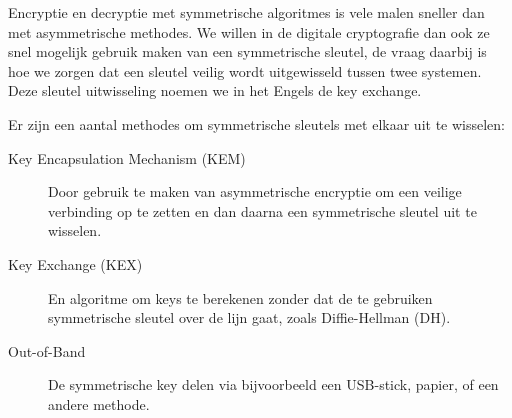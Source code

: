 Encryptie en decryptie met symmetrische algoritmes is vele malen sneller dan met asymmetrische methodes. We willen in de digitale cryptografie dan ook ze snel mogelijk gebruik maken van een symmetrische sleutel, de vraag daarbij is hoe we zorgen dat een sleutel veilig wordt uitgewisseld tussen twee systemen. Deze sleutel uitwisseling noemen we in het Engels de key exchange.

Er zijn een aantal methodes om symmetrische sleutels met elkaar uit te wisselen:
\begin{description}
\item[Key Encapsulation Mechanism (KEM)] Door gebruik te maken van asymmetrische encryptie om een veilige verbinding op te zetten en dan daarna een symmetrische sleutel uit te wisselen.
\item[Key Exchange (KEX)] En algoritme om keys te berekenen zonder dat de te gebruiken symmetrische sleutel over de lijn gaat, zoals Diffie-Hellman (DH).
\item[Out-of-Band] De symmetrische key delen via bijvoorbeeld een USB-stick, papier, of een andere methode.
\end{description}

